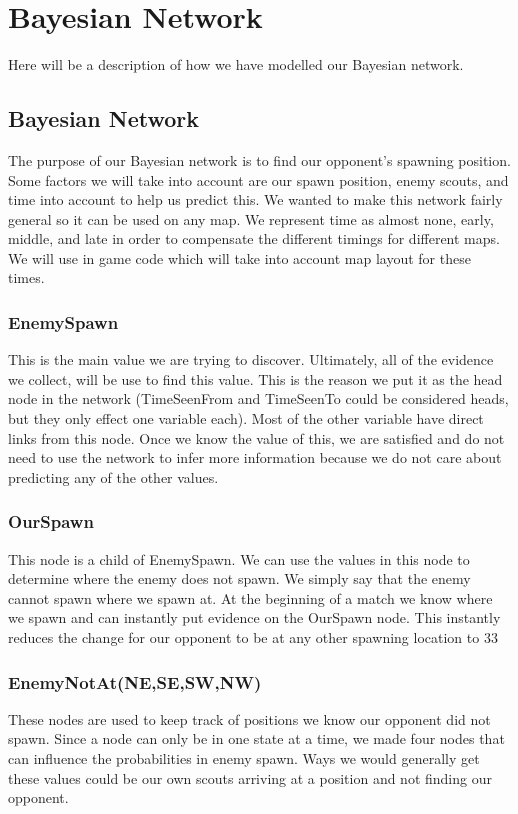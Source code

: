 \section{Bayesian Network}\label{bayesian_network}

Here will be a description of how we have modelled our Bayesian network.

\subsection{Bayesian Network}			 
			
The purpose of our Bayesian network is to find our opponent's spawning position. Some factors we will take into account are our spawn position, enemy scouts, and time into account to help us predict this. We wanted to make this network fairly general so it can be used on any  map. We represent time as almost none, early, middle, and late in order to compensate the different timings for different maps. We will use in game code which will take into account map layout for these times. 

\subsubsection*{EnemySpawn}
This is the main value we are trying to discover. Ultimately, all of the evidence we collect, will be use to find this value. This is the reason we put it as the head node in the network (TimeSeenFrom and TimeSeenTo could be considered heads, but they only effect one variable each). Most of the other variable have direct links from this node. Once we know the value of this, we are satisfied and do not need to use the network to infer more information because we do not care about predicting any of the other values.

\subsubsection*{OurSpawn}
This node is a child of EnemySpawn. We can use the values in this node to determine where the enemy does not spawn. We simply say that the enemy cannot spawn where we spawn at. At the beginning of a match we know where we spawn and can instantly put evidence on the OurSpawn node. This instantly reduces the change for our opponent to be at any other spawning location to 33%

\subsubsection*{EnemyNotAt(NE,SE,SW,NW)}
These nodes are used to keep track of positions we know our opponent did not spawn. Since a node can only be in one state at a time, we made four nodes that can influence the probabilities in enemy spawn. Ways we would generally get these values could be our own scouts arriving at a position and not finding our opponent.

